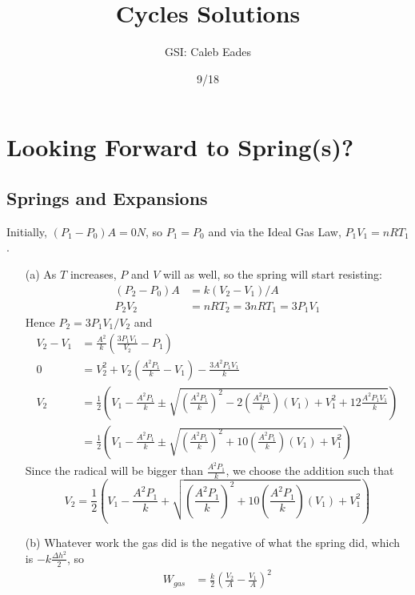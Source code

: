 \documentclass{article}
\begin{document}
\title{Cycles Solutions}
\author{GSI: Caleb Eades}
\date{9/18}
\maketitle

\section{Looking Forward to Spring(s)?}

\subsection{Springs and Expansions}

Initially, $(P_1 - P_0)A = 0 N$, so $P_1 = P_0$ and via the Ideal Gas Law, $P_1V_1 = nRT_1$.
\begin{itemize}
	\item[(a)] As $T$ increases, $P$ and $V$ will as well, so the spring will start resisting:
	\begin{align*}
	(P_2-P_0)A &= k(V_2-V_1)/A \\
	P_2V_2 &= nRT_2 = 3nRT_1 = 3P_1V_1
	\end{align*}
	Hence $P_2 = 3P_1V_1/V_2$ and
	\begin{align*}
	V_2-V_1 &= \frac{A^2}{k}\left(\frac{3P_1V_1}{V_2}-P_1\right) \\
	0 &= V_2^2+V_2\left(\frac{A^2P_1}{k}-V_1\right) - \frac{3A^2P_1V_1}{k} \\
	V_2 &= \frac{1}{2}\left(V_1-\frac{A^2P_1}{k}\pm \sqrt{\left(\frac{A^2P_1}{k}\right)^2-2\left(\frac{A^2P_1}{k}\right)(V_1) + V_1^2 + 12\frac{A^2P_1V_1}{k}}\right) \\
	&= \frac{1}{2}\left(V_1-\frac{A^2P_1}{k}\pm \sqrt{\left(\frac{A^2P_1}{k}\right)^2+10\left(\frac{A^2P_1}{k}\right)(V_1) + V_1^2}\right)
	\end{align*}
	Since the radical will be bigger than $\frac{A^2P_1}{k}$, we choose the addition such that
	\begin{equation}
	V_2 = \frac{1}{2}\left(V_1-\frac{A^2P_1}{k} + \sqrt{\left(\frac{A^2P_1}{k}\right)^2+10\left(\frac{A^2P_1}{k}\right)(V_1) + V_1^2}\right)
	\end{equation}
	\item[(b)] Whatever work the gas did is the negative of what the spring did, which is $-k\frac{\Delta h^2}{2}$, so
	\begin{align*}
	W_{gas} &= \frac{k}{2}\left(\frac{V_2}{A}-\frac{V_1}{A}\right)^2 \\

\end{align*}
\end{itemize}
\end{document}
